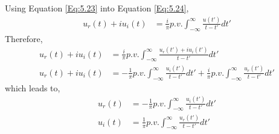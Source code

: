 Using Equation \ref{Eq:5.23} into Equation \ref{Eq:5.24},
\begin{equation}
\begin{split}
u_r(t)+iu_i(t) &=\frac{i}{\pi} p.v. \int_{-\infty}^{\infty} \frac{u(t')}{t-t'} dt' 
\end{split}
\label{Eq:5.24}
\end{equation}
Therefore,
\begin{equation}
\begin{split}
u_r(t)+iu_i(t) &=\frac{i}{\pi} p.v. \int_{-\infty}^{\infty} \frac{u_r(t')+iu_i(t')}{t-t'} dt' \\
u_r(t)+iu_i(t)&=-\frac{1}{\pi} p.v. \int_{-\infty}^{\infty} \frac{u_i(t')}{t-t'} dt' + \frac{i}{\pi} p.v. \int_{-\infty}^{\infty} \frac{u_r(t')}{t-t'} dt'
\end{split}
\label{Eq:5.24}
\end{equation}
which leads to,
\begin{equation}
\begin{split}
u_r(t) &=-\frac{1}{\pi} p.v. \int_{-\infty}^{\infty} \frac{u_i(t')}{t-t'} dt' \\
u_i(t) &=\frac{1}{\pi} p.v. \int_{-\infty}^{\infty} \frac{u_r(t')}{t-t'} dt' \\
\end{split}
\label{Eq:5.24}
\end{equation}



